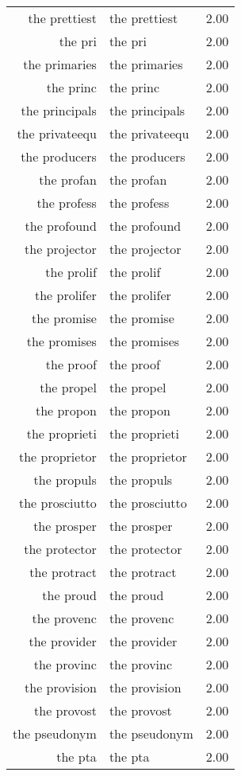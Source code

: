 \begin{table}[ht]
\begin{tabular}{rlr}
  the prettiest & the prettiest & 2.00 \\ 
  the pri & the pri & 2.00 \\ 
  the primaries & the primaries & 2.00 \\ 
  the princ & the princ & 2.00 \\ 
  the principals & the principals & 2.00 \\ 
  the privateequ & the privateequ & 2.00 \\ 
  the producers & the producers & 2.00 \\ 
  the profan & the profan & 2.00 \\ 
  the profess & the profess & 2.00 \\ 
  the profound & the profound & 2.00 \\ 
  the projector & the projector & 2.00 \\ 
  the prolif & the prolif & 2.00 \\ 
  the prolifer & the prolifer & 2.00 \\ 
  the promise & the promise & 2.00 \\ 
  the promises & the promises & 2.00 \\ 
  the proof & the proof & 2.00 \\ 
  the propel & the propel & 2.00 \\ 
  the propon & the propon & 2.00 \\ 
  the proprieti & the proprieti & 2.00 \\ 
  the proprietor & the proprietor & 2.00 \\ 
  the propuls & the propuls & 2.00 \\ 
  the prosciutto & the prosciutto & 2.00 \\ 
  the prosper & the prosper & 2.00 \\ 
  the protector & the protector & 2.00 \\ 
  the protract & the protract & 2.00 \\ 
  the proud & the proud & 2.00 \\ 
  the provenc & the provenc & 2.00 \\ 
  the provider & the provider & 2.00 \\ 
  the provinc & the provinc & 2.00 \\ 
  the provision & the provision & 2.00 \\ 
  the provost & the provost & 2.00 \\ 
  the pseudonym & the pseudonym & 2.00 \\ 
  the pta & the pta & 2.00 \\ 

\end{tabular}
\end{table}
